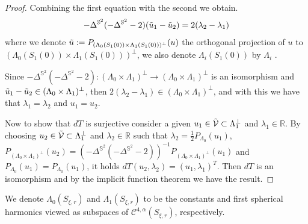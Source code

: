 \documentclass[12pt,a4paper]{amsart}
\theoremstyle{plain}
\theoremstyle{definition}
\begin{document}
\begin{proof}
Combining the first equation with the second we obtain.
$$   -\Delta^{\mathbb{S}^2} (- \Delta^{\mathbb{S}^2} -2) (\Tilde{u}_1- \Tilde{u}_2) = 2(\lambda_2 -\lambda_1) $$
where we denote $\Tilde{u}:=P_{(\Lambda_0(S_1(0)) \times \Lambda_1(S_1(0)))^\bot}(u) $ the orthogonal projection of $u$ to $(\Lambda_0(S_1(0)) \times \Lambda_1(S_1(0)))^\bot$, we also denote $\Lambda_i(S_1(0))$  by $\Lambda_i$ .

 Since $-\Delta^{\mathbb{S}^2} (- \Delta^{\mathbb{S}^2} -2):(\Lambda_0 \times \Lambda_1)^\bot \to (\Lambda_0 \times \Lambda_1)^\bot $ is an isomorphism and $\Tilde{u}_1- \Tilde{u}_2 \in (\Lambda_0 \times \Lambda_1)^\bot $, then $2(\lambda_2 -\lambda_1) \in (\Lambda_0 \times \Lambda_1)^\bot$, and with this we have  that $\lambda_1= \lambda_2$ and $u_1 =u_2 $. 

 Now to show that  $dT$ is surjective  consider a given  $u_1 \in  \Tilde{\mathcal{V}} \subset \Lambda_1^\bot $ and $ \lambda_1 \in \mathbb{R} $.  By choosing  $u_2 \in  \Tilde{\mathcal{V}} \subset \Lambda_1^\bot $ and $ \lambda_2 \in \mathbb{R} $ such that  $\lambda_2 = \frac{1}{2} P_{\Lambda_0}(u_1) $,  $P_{(\Lambda_0 \times \Lambda_1)^\bot}(u_2)=(-\Delta^{\mathbb{S}^2} (- \Delta^{\mathbb{S}^2} -2))^{-1} P_{(\Lambda_0 \times \Lambda_1)^\bot}(u_1) $ and  $P_{\Lambda_0}(u_1)=P_{\Lambda_0}(u_1)$, it holds $dT(u_2,\lambda_2)= (u_1,\lambda_1)^T$. Then $dT$ is an isomorphism and by the implicit function theorem we have the result.
\end{proof}
We denote $ \Lambda_0(S_{\xi,r})$ 
and $ \Lambda_1(S_{\xi,r})$ to be the constants and first spherical harmonics viewed as subspaces of  $\mathcal{C}^{4,\alpha}(S_{\xi, r})$, respectively.
\end{document}
